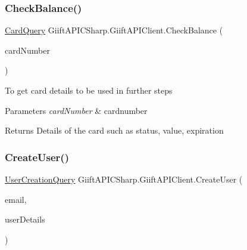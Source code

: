 \subsubsection{\texorpdfstring{Check\+Balance()}{CheckBalance()}}
{\footnotesize\ttfamily \hyperlink{class_giift_a_p_i_c_sharp_1_1_card_query}{Card\+Query} Giift\+A\+P\+I\+C\+Sharp.\+Giift\+A\+P\+I\+Client.\+Check\+Balance (\begin{DoxyParamCaption}\item[{string}]{card\+Number }\end{DoxyParamCaption})\hspace{0.3cm}{\ttfamily [inline]}}



To get card details to be used in further steps 


\begin{DoxyParams}{Parameters}
{\em card\+Number} & cardnumber\\
\hline
\end{DoxyParams}
\begin{DoxyReturn}{Returns}
Details of the card such as status, value, expiration
\end{DoxyReturn}
\mbox{\label{class_giift_a_p_i_c_sharp_1_1_giift_a_p_i_client_a46db39b0aaaca40361210625fd4ba3ae}} 
\subsubsection{\texorpdfstring{Create\+User()}{CreateUser()}}
{\footnotesize\ttfamily \hyperlink{class_giift_a_p_i_c_sharp_1_1_user_creation_query}{User\+Creation\+Query} Giift\+A\+P\+I\+C\+Sharp.\+Giift\+A\+P\+I\+Client.\+Create\+User (\begin{DoxyParamCaption}\item[{string}]{email,  }\item[{\hyperlink{class_giift_a_p_i_c_sharp_1_1_user_creation_details}{User\+Creation\+Details}}]{user\+Details }\end{DoxyParamCaption})\hspace{0.3cm}{\ttfamily [inline]}}



